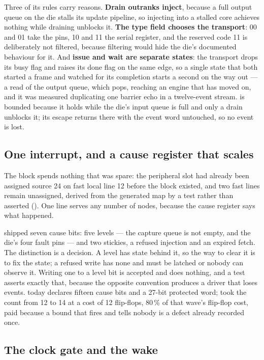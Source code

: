 Three of its rules carry reasons. \textbf{Drain outranks inject},
because a full output queue on the die stalls its update pipeline, so
injecting into a stalled core achieves nothing while draining unblocks
it. \textbf{The type field chooses the transport}: 00 and 01 take the
pins, 10 and 11 the serial register, and the reserved code 11 is
deliberately not filtered, because filtering would hide the die's
documented behaviour for it. And \textbf{issue and wait are separate
states}: the transport drops its busy flag and raises its done flag on
the same edge, so a single state that both started a frame and watched
for its completion starts a second on the way out --- a read of the
output queue, which pops, reaching an engine that has moved on, and it
was measured duplicating one barrier echo in a twelve-event stream.
 is bounded because it holds while the die's input
queue is full and only a drain unblocks it; its escape returns there
with the event word untouched, so no event is lost.

\subsection{One interrupt, and a cause register that scales}

The block spends nothing that was spare: the peripheral slot had
already been assigned source 24 on fast local line 12 before the block
existed, and two fast lines remain unassigned, derived from the
generated map by a test rather than asserted ().
One line serves any number of nodes, because the cause register says
what happened.

 shipped seven cause bits: five levels --- the capture
queue is not empty, and the die's four fault pins --- and two stickies,
a refused injection and an expired fetch. The distinction is a
decision. A level has state behind it, so the way to clear it is to fix
the state; a refused write has none and must be latched or nobody can
observe it. Writing one to a level bit is accepted and does nothing,
and a test asserts exactly that, because the opposite convention
produces a driver that loses events.
 today declares fifteen cause
bits and a 27-bit protected word;  took the
count from 12 to 14 at a cost of 12 flip-flops, 80\,\% of that wave's
flip-flop cost, paid because a bound that fires and tells nobody is a
defect already recorded once.

\subsection{The clock gate and the wake}

